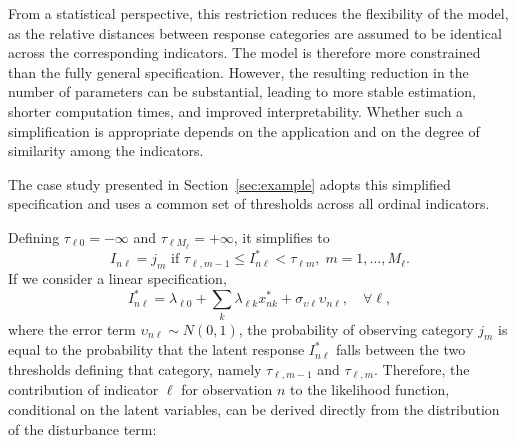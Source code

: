 \documentclass[12pt,a4paper]{article}
\begin{document}
From a statistical perspective, this restriction reduces the
flexibility of the model, as the relative distances between response
categories are assumed to be identical across the corresponding
indicators. The model is therefore more constrained than the fully
general specification. However, the resulting reduction in the number
of parameters can be substantial, leading to more stable estimation,
shorter computation times, and improved interpretability. Whether such
a simplification is appropriate depends on the application and on the
degree of similarity among the indicators.

The case study presented in Section~\ref{sec:example} adopts this
simplified specification and uses a common set of thresholds across
all ordinal indicators.

Defining $\tau_{\ell 0}=-\infty$ and $\tau_{\ell M_\ell}=+\infty$, it
simplifies to
\begin{equation}
  \label{eq:prob_indicator}
I_{n\ell} = j_m \text{ if } \tau_{\ell, m-1} \leq I^*_{n\ell} <
\tau_{\ell m}, \; m=1, \ldots, M_\ell.
\end{equation}
If we consider a linear specification,
\begin{equation}
  \label{eq:measurement_latent}
I^*_{n\ell} = \lambda_{\ell 0} + \sum_k \lambda_{\ell k} x_{nk}^* +
\sigma_{\upsilon \ell} \upsilon_{n\ell}, \quad \forall \ell,
\end{equation}
where the error term \(\upsilon_{n\ell} \sim N(0,1)\), the
probability of observing category \(j_m\) is equal to the probability
that the latent response \(I^*_{n\ell}\) falls between the two
thresholds defining that category, namely
\(\tau_{\ell,m-1}\) and \(\tau_{\ell,m}\). Therefore, the
contribution of indicator \(\ell\) for observation \(n\) to the
likelihood function, conditional on the latent variables, can be
derived directly from the distribution of the disturbance term:
\end{document}
